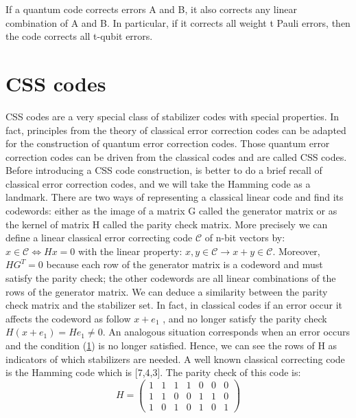 \begin{theorem}
If a quantum code corrects errors A and B, it also corrects any linear combination of A and B. In particular, if it corrects all weight t Pauli errors, then the code corrects all t-qubit errors.
\end{theorem}


\section{CSS codes}
CSS codes are a very special class of stabilizer codes with special properties. In fact, principles from the theory of classical error correction codes can be adapted for the construction of quantum error correction codes. Those quantum error correction codes can be driven from the classical codes and are called CSS codes.
Before introducing a CSS code construction, is better to do a brief recall of classical error correction codes, and we will take the Hamming code as a landmark.
There are two ways of representing a classical linear code and find its codewords: either as the image of a matrix G called the generator matrix or as the kernel of matrix H called the parity check matrix. More precisely we can define a linear classical error correcting code $\mathcal{C}$ of n-bit vectors by: $x \in \mathcal{C} \iff  Hx = 0$ with the linear property: $x,y \in \mathcal{C} \rightarrow x+y \in \mathcal{C}$. Moreover, $HG^T=0$ because each row of the generator matrix is a codeword and must satisfy the parity check; the other codewords are all linear combinations of the rows of the generator matrix.
We can deduce a similarity between the parity check matrix and the stabilizer set. 
In fact, in classical codes if an error occur it affects the codeword as follow $x+e_1$ , and no longer satisfy the parity check $H(x+e_1) = He_1 \neq 0$. An analogous situation corresponds when an error occurs and the condition (\ref{}) is no longer satisfied.  
Hence, we can see the rows of H as indicators of which stabilizers are needed.
A well known classical correcting code is the Hamming code which is [7,4,3]. The parity check of this code is: 
\begin{equation*}
    H=\left(\begin{array}{ccccccc}
         1&1&1&1&0&0&0  \\
         1&1&0&0&1&1&0 \\
         1&0&1&0&1&0&1 
    \end{array}\right) 
\end{equation*}
